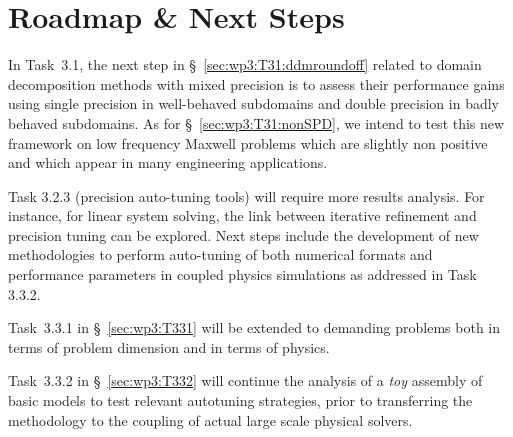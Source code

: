 \section{Roadmap \& Next Steps}


In Task~3.1, the next step in \S~\ref{sec:wp3:T31:ddmroundoff} related to domain decomposition 
methods with mixed precision is to assess their performance gains using single precision in well-behaved subdomains and double precision in badly behaved subdomains. As for \S~\ref{sec:wp3:T31:nonSPD}, we intend to test this new framework on low frequency Maxwell problems which are slightly non positive and which appear in many engineering applications. 


Task 3.2.3 (precision auto-tuning tools) will require 
more results analysis. For instance, for linear system solving, the link between iterative refinement and precision tuning can be explored.
Next steps include the development of new methodologies to perform auto-tuning of both numerical formats and performance parameters in coupled physics simulations as addressed in Task 3.3.2.

Task~3.3.1 in \S~\ref{sec:wp3:T331} will be extended to demanding problems both in terms of problem dimension and in terms of physics. 

Task~3.3.2 in \S~\ref{sec:wp3:T332} will continue the analysis of a \textit{toy} assembly of basic models to test relevant autotuning strategies, prior to transferring the methodology to the coupling of actual large scale physical solvers.

